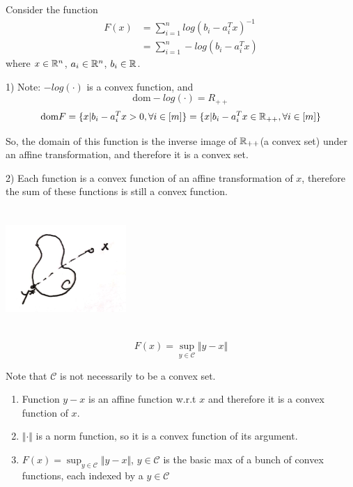 \begin{example} Consider the function 
\begin{align*}
F(x) 
&= \sum^{n}_{i=1}log(b_i - a_i^Tx)^{-1}\\
&=\sum^n_{i=1}-log(b_i - a_i^Tx)
\end{align*}
where $x \in \mathbb{R}^n$, $a_i\in \mathbb{R}^n$, $b_i\in \mathbb{R}$.

1) Note: $-log(\cdot)$ is a convex function, and 
$$\text{dom}-log(\cdot) = R_{++}$$
$$\text{dom}F = \{x|b_i - a_i^Tx >0, \forall i\in [m] \} =\{x|b_i - a_i^Tx \in \mathbb{R}_{++}, \forall i\in [m]\}$$ 

So, the domain of this function is the inverse image of $\mathbb{R}_{++}$(a convex set) under an affine transformation, and therefore it is a convex set. 

2) Each function is a convex function of an affine transformation of $x$, therefore the sum of these functions is still a convex function.
\end{example}

\begin{example}
\begin{marginfigure}
	\centering
	\includegraphics[width=1.8in,height=1.8in]{figures/ch08/figure1104_1.png}
\end{marginfigure}

\begin{equation*}
F(x) = \sup_{y\in \mathcal{C}}\Vert y-x\Vert
\end{equation*}

Note that $\mathcal{C}$ is not necessarily to be a convex set. 

\begin{enumerate}
	\item Function $y-x$ is an affine function w.r.t $x$ and therefore it is a convex function of $x$.
	
	\item $\Vert\cdot\Vert$ is a norm function, so it is a convex function of its argument. 
	
	\item $F(x) = \sup_{y\in \mathcal{C}}\Vert y-x\Vert$, $y\in \mathcal{C}$ is the basic max of a bunch of convex functions, each indexed by a $y\in \mathcal{C}$
\end{enumerate}
\end{example}



